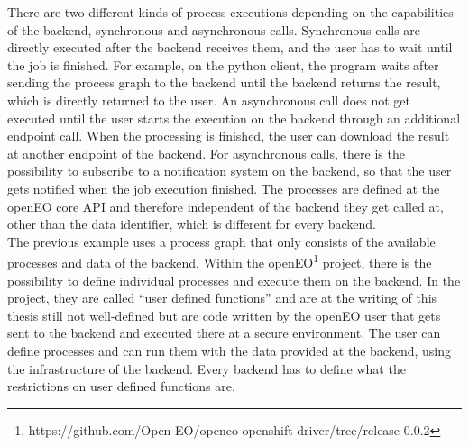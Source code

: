 \documentclass[draft,final]{vutinfth} %
\begin{document}
There are two different kinds of process executions depending on the capabilities of the backend, synchronous and asynchronous calls. Synchronous calls are directly executed after the backend receives them, and the user has to wait until the job is finished. For example, on the python client, the program waits after sending the process graph to the backend until the backend returns the result, which is directly returned to the user. An asynchronous call does not get executed until the user starts the execution on the backend through an additional endpoint call. When the processing is finished, the user can download the result at another endpoint of the backend. For asynchronous calls, there is the possibility to subscribe to a notification system on the backend, so that the user gets notified when the job execution finished.     
The processes are defined at the openEO core API and therefore independent of the backend they get called at, other than the data identifier, which is different for every backend.  
\\
The previous example uses a process graph that only consists of the available processes and data of the backend. Within the openEO\footnote{https://github.com/Open-EO/openeo-openshift-driver/tree/release-0.0.2} project, there is the possibility to define individual processes and execute them on the backend. In the project, they are called “user defined functions” and are at the writing of this thesis still not well-defined but are code written by the openEO user that gets sent to the backend and executed there at a secure environment. The user can define processes and can run them with the data provided at the backend, using the infrastructure of the backend. Every backend has to define what the restrictions on user defined functions are. 
\end{document}
